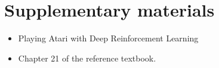 \documentclass[11pt, a4paper]{article}
\begin{document}
\newpage

\section*{Supplementary materials}

\begin{itemize}
    \item Playing Atari with Deep Reinforcement Learning


    \item Chapter 21 of the reference textbook.
\end{itemize}
\end{document}
